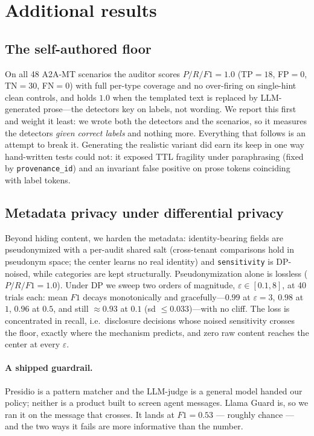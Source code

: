 \documentclass{article}
\begin{document}
\section{Additional results}
\subsection{The self-authored floor}
On all 48 A2A-MT scenarios the auditor scores $P/R/F1=1.0$ (TP$=18$, FP$=0$,
TN$=30$, FN$=0$) with full per-type coverage and no over-firing on single-hint
clean controls, and holds $1.0$ when the templated text is replaced by
LLM-generated prose---the detectors key on labels, not wording. We report this
first and weight it least: we wrote both the detectors and the scenarios, so it
measures the detectors \emph{given correct labels} and nothing more. Everything
that follows is an attempt to break it. Generating the realistic variant did earn
its keep in one way hand-written tests could not: it exposed TTL fragility under
paraphrasing (fixed by \texttt{provenance\_id}) and an invariant false positive on
prose tokens coinciding with label tokens.

\subsection{Metadata privacy under differential privacy}
Beyond hiding content, we harden the
metadata: identity-bearing fields are pseudonymized with a per-audit shared salt
(cross-tenant comparisons hold in pseudonym space; the center learns no real
identity) and \texttt{sensitivity} is DP-noised, while categories are kept
structurally. Pseudonymization alone is lossless ($P/R/F1=1.0$). Under DP we
sweep two orders of magnitude, $\varepsilon\in[0.1,8]$, at 40 trials each: mean
$F1$ decays monotonically and gracefully---$0.99$ at $\varepsilon{=}3$, $0.98$ at
$1$, $0.96$ at $0.5$, and still $\approx0.93$ at $0.1$ (sd $\le0.033$)---with no
cliff. The loss is concentrated in recall, i.e.\ disclosure decisions whose noised
sensitivity crosses the floor, exactly where the mechanism predicts, and zero raw
content reaches the center at every $\varepsilon$.

\paragraph{A shipped guardrail.} Presidio is a pattern matcher and the LLM-judge is
a general model handed our policy; neither is a product built to screen agent
messages. Llama Guard is, so we ran it on the message that crosses. It lands at
$F1=0.53$ --- roughly chance --- and the two ways it fails are more informative
than the number.\label{sec:guard}
\end{document}
